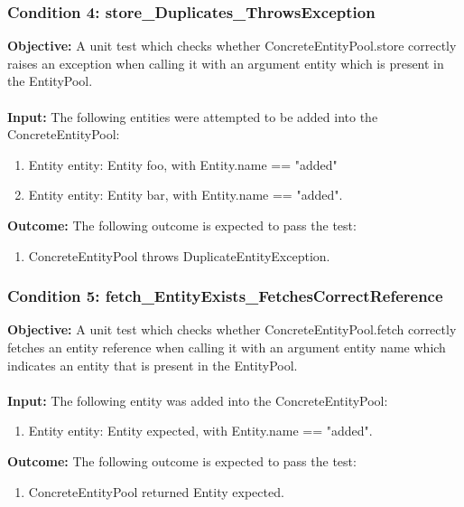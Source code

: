 \documentclass[a4paper,12pt]{article}
\begin{document}
		\subsubsection{Condition 4: store\_Duplicates\_ThrowsException}
			\textbf{Objective:} A unit test which checks whether ConcreteEntityPool.store correctly raises an exception when calling it with an argument entity which is present in the EntityPool.\\\\
			\textbf{Input:} The following entities were attempted to be added into the ConcreteEntityPool:
				\begin{enumerate}
					\item Entity entity: Entity foo, with Entity.name == "added"
					\item Entity entity: Entity bar, with Entity.name == "added".\\
				\end{enumerate}
			\textbf{Outcome:} The following outcome is expected to pass the test:
				\begin{enumerate}
					\item ConcreteEntityPool throws DuplicateEntityException.
				\end{enumerate}
		\subsubsection{Condition 5: fetch\_EntityExists\_FetchesCorrectReference}
			\textbf{Objective:} A unit test which checks whether ConcreteEntityPool.fetch correctly fetches an entity reference when calling it with an argument entity name which indicates an entity that is present in the EntityPool.\\\\
			\textbf{Input:} The following entity was added into the ConcreteEntityPool:
				\begin{enumerate}
					\item Entity entity: Entity expected, with Entity.name == "added".\\
				\end{enumerate}
			\textbf{Outcome:} The following outcome is expected to pass the test:
				\begin{enumerate}
					\item ConcreteEntityPool returned Entity expected.
				\end{enumerate}
\end{document}
